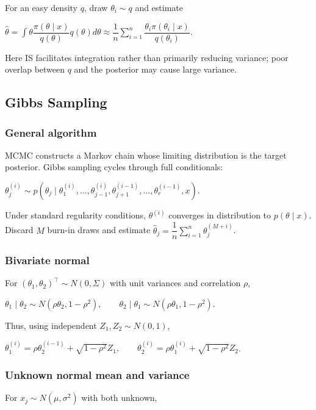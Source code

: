 For an easy density $q$, draw $\theta_i\sim q$ and estimate

$\hat\theta=\int\theta\dfrac{\pi(\theta\mid x)}{q(\theta)}q(\theta)d\theta\approx\dfrac1n\sum_{i=1}^n\dfrac{\theta_i\pi(\theta_i\mid x)}{q(\theta_i)}$.

Here IS facilitates integration rather than primarily reducing variance; poor overlap between $q$ and the posterior may cause large variance.

\subsection{Gibbs Sampling}

\subsubsection*{General algorithm}

MCMC constructs a Markov chain whose limiting distribution is the target posterior. Gibbs sampling cycles through full conditionals:

$\theta_j^{(i)}\sim p(\theta_j\mid\theta_1^{(i)},\ldots,\theta_{j-1}^{(i)},\theta_{j+1}^{(i-1)},\ldots,\theta_r^{(i-1)},x)$.

Under standard regularity conditions, $\theta^{(i)}$ converges in distribution to $p(\theta\mid x)$. Discard $M$ burn-in draws and estimate
$\hat\theta_j=\dfrac1n\sum_{i=1}^n\theta_j^{(M+i)}$.

\subsubsection*{Bivariate normal}

For $(\theta_1,\theta_2)^\top\sim N(0,\Sigma)$ with unit variances and correlation $\rho$,

$\theta_1\mid\theta_2\sim N(\rho\theta_2,1-\rho^2),\qquad \theta_2\mid\theta_1\sim N(\rho\theta_1,1-\rho^2)$.

Thus, using independent $Z_1,Z_2\sim N(0,1)$,

$\theta_1^{(i)}=\rho\theta_2^{(i-1)}+\sqrt{1-\rho^2}Z_1,\qquad \theta_2^{(i)}=\rho\theta_1^{(i)}+\sqrt{1-\rho^2}Z_2$.

\subsubsection*{Unknown normal mean and variance}

For $x_j\sim N(\mu,\sigma^2)$ with both unknown,

